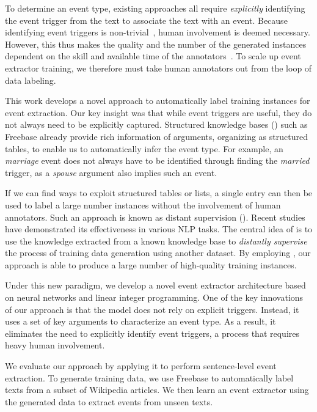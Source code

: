 To determine an event type, existing approaches  all require \emph{explicitly} identifying the event trigger from the text to associate the
text with an event. Because identifying event triggers is non-trivial~\FIXME{\cite{}}, human involvement is deemed necessary. However, this
thus makes the quality and the number of the generated instances dependent on the skill and available time of the
annotators~\cite{aguilar2014comparison,song2015light}. To scale up event extractor training, we therefore must take human annotators out
from the loop of data labeling.


This work develops a novel approach to automatically label training instances for event extraction. Our key insight was that while event
triggers are useful, they do not always need to be explicitly captured. Structured knowledge bases (\KBs) such as Freebase already provide
rich information of arguments, organizing as structured tables, to enable us to automatically infer the event type. For example, an
\emph{marriage} event does not always have to be identified through finding the \emph{married} trigger, as a \emph{spouse} argument also
implies
such an event. %


If we can find ways to exploit structured tables or lists, a single entry can then be used to label a large number instances without the
involvement of human annotators. Such an approach is known as distant supervision (\DS). Recent
studies~\cite{mintz2009distant,zeng2015distant} have demonstrated its effectiveness in various NLP tasks. The central idea of \DS is to use
the knowledge extracted from a known knowledge base to \emph{distantly supervise} the process of training data generation using another
dataset. By employing \DS, our approach is able to produce a large number of high-quality training instances.

Under this new \DS paradigm, we develop a novel event extractor architecture based on neural networks and linear integer programming. One
of the key innovations of our approach is that the model does not rely on explicit triggers. Instead, it uses a set of key arguments to
characterize an event type. As a result, it eliminates the need to explicitly identify event triggers, a process that requires heavy human
involvement.

We evaluate our approach by  applying it to perform sentence-level event extraction. To generate training data, we use Freebase to
automatically label texts from a subset of Wikipedia articles. We then learn an event extractor using the generated data  to extract events
from unseen texts.

